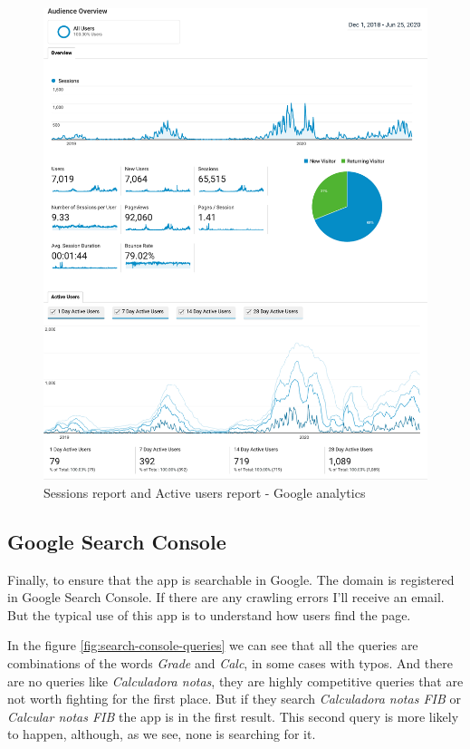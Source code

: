 \vfill
\begin{figure}[h!]
    \center
    \includegraphics[width=1\columnwidth]{media/analytics-double-report.pdf}
    \caption{Sessions report and Active users report - Google analytics}
    \label{fig:analytics}
\end{figure}
\vfill

\clearpage\newpage
\subsection{Google Search Console}

Finally, to ensure that the app is searchable in Google. The domain is registered in Google Search Console. If there are any crawling errors I'll receive an email. But the typical use of this app is to understand how users find the page. 

In the figure \ref{fig:search-console-queries} we can see that all the queries are combinations of the words \textit{Grade} and \textit{Calc}, in some cases with typos. And there are no queries like \textit{Calculadora notas}, they are highly competitive queries that are not worth fighting for the first place. But if they search \textit{Calculadora notas FIB} or \textit{Calcular notas FIB} the app is in the first result. This second query is more likely to happen, although, as we see, none is searching for it.

